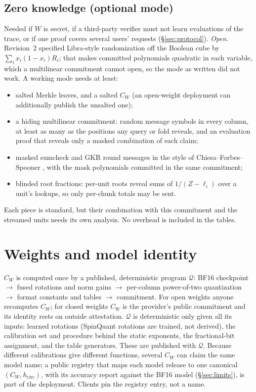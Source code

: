 \documentclass[11pt]{article}
\begin{document}
\subsection{Zero knowledge (optional mode)}
\label{sec:zk}

Needed if \(W\) is secret, if a third-party verifier must not learn evaluations of the trace, or if one proof covers several users' requests (\S\ref{sec:protocol}).
\emph{Open.} Revision~2 specified Libra-style randomization off the Boolean cube by \(\sum_i x_i(1-x_i) R_i\); that makes committed polynomials quadratic in each variable, which a multilinear commitment cannot open, so the mode as written did not work.
A working mode needs at least:
\begin{itemize}
\item salted Merkle leaves, and a salted \(C_W\) (an open-weight deployment can additionally publish the unsalted one);
\item a hiding multilinear commitment: random message symbols in every column, at least as many as the positions any query or fold reveals, and an evaluation proof that reveals only a masked combination of each claim;
\item masked sumcheck and GKR round messages in the style of Chiesa--Forbes--Spooner \cite{cfs}, with the mask polynomials committed in the same commitment;
\item blinded root fractions: per-unit roots reveal sums of \(1/(Z - \ell_i)\) over a unit's lookups, so only per-chunk totals may be sent.
\end{itemize}
Each piece is standard, but their combination with this commitment and the streamed units needs its own analysis.
No overhead is included in the tables.

\section{Weights and model identity}
\label{sec:weights}

\(C_W\) is computed once by a published, deterministic program \(\mathcal{Q}\): BF16 checkpoint \(\to\) fused rotations and norm gains \(\to\) per-column power-of-two quantization \(\to\) format constants and tables \(\to\) commitment.
For open weights anyone recomputes \(C_W\); for closed weights \(C_W\) is the provider's public commitment and its identity rests on outside attestation.
\(\mathcal{Q}\) is deterministic only given all its inputs: learned rotations (SpinQuant rotations are trained, not derived), the calibration set and procedure behind the static exponents, the fractional-bit assignment, and the table generators.
These are published with \(\mathcal{Q}\).
Because different calibrations give different functions, several \(C_W\) can claim the same model name; a public registry that maps each model release to one canonical \((C_W, h_{\mathrm{circ}})\), with its accuracy report against the BF16 model (\S\ref{sec:limits}), is part of the deployment.
Clients pin the registry entry, not a name.
\end{document}
